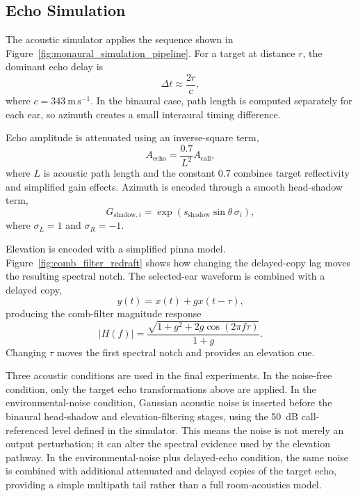 \subsection{Echo Simulation}

The acoustic simulator applies the sequence shown in Figure~\ref{fig:monaural_simulation_pipeline}. For a target at distance $r$, the dominant echo delay is
\begin{equation}
    \Delta t \approx \frac{2r}{c},
\end{equation}
where $c=343~\mathrm{m\,s^{-1}}$. In the binaural case, path length is computed separately for each ear, so azimuth creates a small interaural timing difference.



Echo amplitude is attenuated using an inverse-square term,
\begin{equation}
    A_{\mathrm{echo}} = \frac{0.7}{L^2}A_{\mathrm{call}},
\end{equation}
where $L$ is acoustic path length and the constant $0.7$ combines target reflectivity and simplified gain effects. Azimuth is encoded through a smooth head-shadow term,
\begin{equation}
    G_{\mathrm{shadow},i}
    =
    \exp\left(s_{\mathrm{shadow}}\sin\theta\,\sigma_i\right),
\end{equation}
where $\sigma_L=1$ and $\sigma_R=-1$.

Elevation is encoded with a simplified pinna model. Figure~\ref{fig:comb_filter_redraft} shows how changing the delayed-copy lag moves the resulting spectral notch. The selected-ear waveform is combined with a delayed copy,
\begin{equation}
    y(t)=x(t)+g x(t-\tau),
\end{equation}
producing the comb-filter magnitude response
\begin{equation}
    |H(f)| = \frac{\sqrt{1+g^2+2g\cos(2\pi f \tau)}}{1+g}.
\end{equation}
Changing $\tau$ moves the first spectral notch and provides an elevation cue.

Three acoustic conditions are used in the final experiments. In the noise-free condition, only the target echo transformations above are applied. In the environmental-noise condition, Gaussian acoustic noise is inserted before the binaural head-shadow and elevation-filtering stages, using the 50~dB call-referenced level defined in the simulator. This means the noise is not merely an output perturbation; it can alter the spectral evidence used by the elevation pathway. In the environmental-noise plus delayed-echo condition, the same noise is combined with additional attenuated and delayed copies of the target echo, providing a simple multipath tail rather than a full room-acoustics model.

